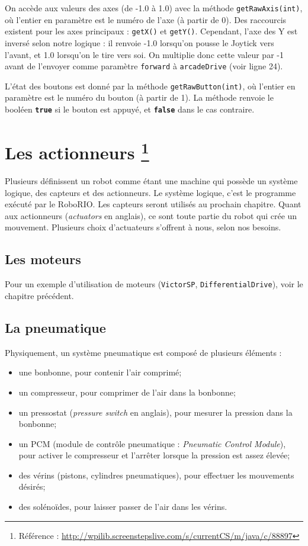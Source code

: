 \documentclass[12pt]{report}
\begin{document}
On accède aux valeurs des axes (de -1.0 à 1.0) avec la méthode \texttt{getRawAxis(int)}, où l'entier en paramètre est le numéro de l'axe (à partir de 0). Des raccourcis existent pour les axes principaux : \texttt{getX()} et \texttt{getY()}. Cependant, l'axe des Y est inversé selon notre logique : il renvoie -1.0 lorsqu'on pousse le Joytick vers l'avant, et 1.0 lorsqu'on le tire vers soi. On multiplie donc cette valeur par -1 avant de l'envoyer comme paramètre \texttt{forward} à \texttt{arcadeDrive} (voir ligne 24).

L'état des boutons est donné par la méthode \texttt{getRawButton(int)}, où l'entier en paramètre est le numéro du bouton (à partir de 1). La méthode renvoie le booléen \texttt{\bfseries true} si le bouton est appuyé, et \texttt{\bfseries false} dans le cas contraire.



\chapter[Les actionneurs]{Les actionneurs \footnote{Référence : \url{http://wpilib.screenstepslive.com/s/currentCS/m/java/c/88897}}}

Plusieurs définissent un robot comme étant une machine qui possède un système logique, des capteurs et des actionneurs. Le système logique, c'est le programme exécuté par le RoboRIO. Les capteurs seront utilisés au prochain chapitre. Quant aux actionneurs (\textit{actuators} en anglais), ce sont toute partie du robot qui crée un mouvement. Plusieurs choix d'actuateurs s'offrent à nous, selon nos besoins.

\section{Les moteurs}
Pour un exemple d'utilisation de moteurs (\texttt{VictorSP}, \texttt{DifferentialDrive}), voir le chapitre précédent.

\section{La pneumatique}
Physiquement, un système pneumatique est composé de plusieurs éléments :

\begin{itemize}
	\item une bonbonne, pour contenir l'air comprimé;
	\item un compresseur, pour comprimer de l'air dans la bonbonne;
	\item un pressostat (\textit{pressure switch} en anglais), pour mesurer la pression dans la bonbonne;
	\item un PCM (module de contrôle pneumatique : \textit{Pneumatic Control Module}), pour activer le compresseur et l'arrêter lorsque la pression est assez élevée;
	\item des vérins (pistons, cylindres pneumatiques), pour effectuer les mouvements désirés;
	\item des solénoïdes, pour laisser passer de l'air dans les vérins.
\end{itemize}
\end{document}
